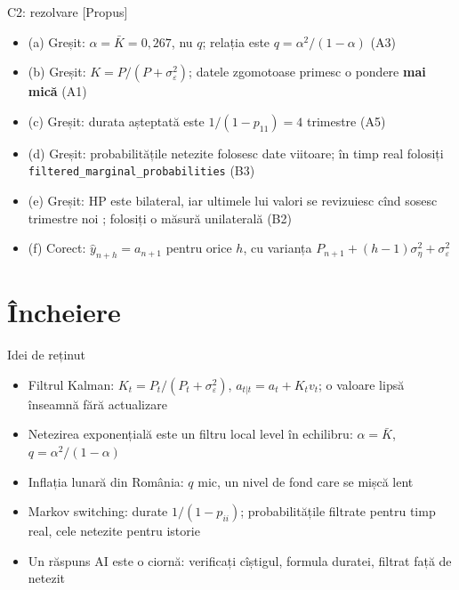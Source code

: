 \ifsolutions
\begin{frame}{C2: rezolvare [Propus]}
\itemsize{\scriptsize}
\begin{itemize}
    \item (a) Greșit: $\alpha = \bar K = 0{,}267$, nu $q$; relația este $q = \alpha^2/(1 - \alpha)$ (A3)
    \item (b) Greșit: $K = P/(P + \sigma^2_\varepsilon)$; datele zgomotoase primesc o pondere \textbf{mai mică} (A1)
    \item (c) Greșit: durata așteptată este $1/(1 - p_{11}) = 4$ trimestre (A5)
    \item (d) Greșit: probabilitățile netezite folosesc date viitoare; în timp real folosiți \texttt{filtered\_marginal\_probabilities} (B3)
    \item (e) Greșit: HP este bilateral, iar ultimele lui valori se revizuiesc cînd sosesc trimestre noi ; folosiți o măsură unilaterală (B2)
    \item (f) Corect: $\hat y_{n+h} = a_{n+1}$ pentru orice $h$, cu varianța $P_{n+1} + (h - 1)\sigma^2_\eta + \sigma^2_\varepsilon$
\end{itemize}
\end{frame}
\fi


\section{Încheiere}

\begin{frame}{Idei de reținut}
\itemsize{\small}
\begin{itemize}
    \item Filtrul Kalman: $K_t = P_t/(P_t + \sigma^2_\varepsilon)$, $a_{t|t} = a_t + K_tv_t$; o valoare lipsă înseamnă fără actualizare
    \item Netezirea exponențială este un filtru local level în echilibru: $\alpha = \bar K$, $q = \alpha^2/(1 - \alpha)$
    \item Inflația lunară din România: $q$ mic, un nivel de fond care se mișcă lent
    \item Markov switching: durate $1/(1 - p_{ii})$; probabilitățile filtrate pentru timp real, cele netezite pentru istorie
    \item Un răspuns AI este o ciornă: verificați cîștigul, formula duratei, filtrat față de netezit
\end{itemize}
\end{frame}

